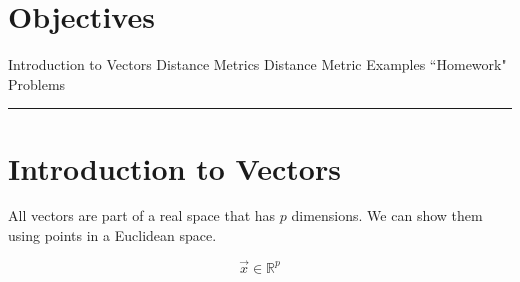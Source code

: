 \section*{Objectives}
\begin{outline}
    \1 Introduction to Vectors
    \1 Distance Metrics
    \1 Distance Metric Examples
    \1 ``Homework" Problems
\end{outline}

\rule[0.0051in]{\textwidth}{0.00025in}

\section{Introduction to Vectors}

All vectors are part of a real space that has $p$ dimensions. We can show them using points in a Euclidean space.

\[
  \vec{x} \in \mathbb{R}^p
\] 

